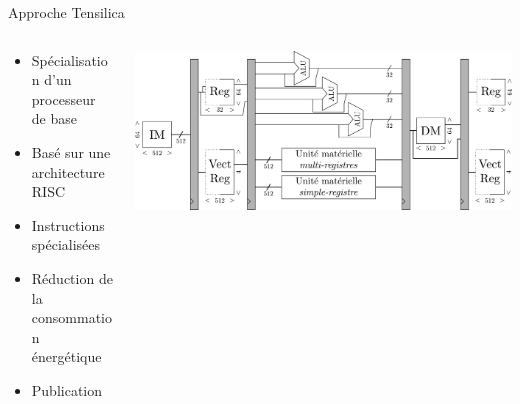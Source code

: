 \begin{frame}[c]{Approche Tensilica}
\renewcommand{\section}[2]{} %

  \begin{columns}
    \begin{column}{.40\textwidth}
    \vspace{-1cm}
      \begin{itemize}
        \item Spécialisation d'un processeur de base
        \item Basé sur une architecture RISC
        \item Instructions spécialisées
        \item<2-> Réduction de la consommation énergétique
        \item<2-> Publication
  
      \end{itemize}
    \end{column}
    \begin{column}[T]{.60\textwidth}
    \vspace{-0.5cm}

  \begin{minipage}[c][0cm][t]{\textwidth}

    \only<+>
    { 

      \includegraphics[width=\textwidth]{./fig/archi_tensilica}
    }
    \only<+->
    {
    \begin{table}[t]
      \centering
      {\small{}}
\end{table}}
\end{minipage}
\end{column}
\end{columns}
\end{frame}
